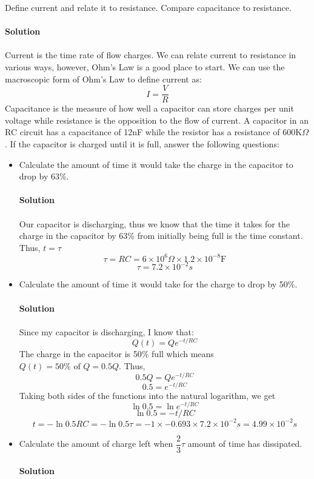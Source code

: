 \documentclass[9pt,addpoints]{exam}
\begin{document}
	\begin{questions}
		\question Define current and relate it to resistance. Compare capacitance to resistance. \\ \\
		\textbf{Solution}\\ \\
		Current is the time rate of flow charges. We can relate current to resistance in various ways, however, Ohm's Law is a good place to start. We can use the macroscopic form of Ohm's Law to define current as:
		$$I=\dfrac{V}{R}$$
		Capacitance is the measure of how well a capacitor can store charges per unit voltage while resistance is the opposition to the flow of current.
		\question A capacitor in an RC circuit has a capacitance of 12nF while the resistor has a resistance of 600K$\Omega$. If the capacitor is charged until it is full, answer the following questions:
		\begin{itemize}
			\item Calculate the amount of time it would take the charge in the capacitor to drop by 63\%.
			\\ \\
			\textbf{Solution}\\ \\
			Our capacitor is discharging, thus we know that the time it takes for the charge in the capacitor by 63\% from initially being full is the time constant. Thus, $t=\tau$
			$$\tau=RC=6\times10^6\Omega\times1.2\times10^{-8}\text{F}$$
			$$\tau=7.2\times10^{-2}s$$
			\item Calculate the amount of time it would take for the charge to drop by 50\%. \\ \\
			\textbf{Solution}\\ \\
			Since my capacitor is discharging, I know that:
			$$Q(t)=Qe^{-t/RC}$$
			The charge in the capacitor is 50\% full which means $Q(t)=50\%\text{ of }Q=0.5Q.$ Thus,
			$$0.5Q=Qe^{-t/RC}$$
			$$0.5=e^{-t/RC}$$
			Taking both sides of the functions into the natural logarithm, we get
			$$\ln0.5=\ln e^{-t/RC}$$
			$$\ln0.5=-t/RC$$	
			$$t=-\ln0.5RC=-\ln0.5\tau=-1\times-0.693\times7.2\times10^{-2}s=4.99\times10^{-2}s$$
			\item Calculate the amount of charge left when $\dfrac{2}{3}\tau$ amount of time has dissipated.\\ \\
			\textbf{Solution}\\ \\

\end{itemize}
\end{questions}
\end{document}
